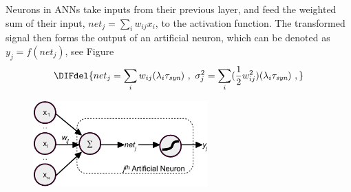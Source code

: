 	
	\DIFaddend Neurons in ANNs take inputs from their previous layer, and feed the weighted sum of their input, $net_j = \sum_i w_{ij}x_i$, to the activation function.
	The transformed signal then forms the output of an artificial neuron, which can be denoted as $y_j=f(net_j)$, see Figure~\DIFdelbegin {}\begin{displaymath}
	\DIFdel{net_j = \sum_i w_{ij}(\lambda_{i}\tau_{\textit{\textrm{syn}}})~,
	~\sigma^2_j= \sum_i (\frac{1}{2} w_{ij}^2)(\lambda_{i}\tau_{\textit{\textrm{syn}}})~, 
	\label{equ:mi_input}
	}\end{displaymath}
\DIFdelend \DIFaddbegin {}

	\begin{figure}[bt]
		\centering
		\includegraphics[width=0.6\textwidth]{pics_iconip/neuron.pdf}
		\caption[A conventional artificial neuron.]{}
		\label{Fig:tneuron_c}
	\end{figure}

